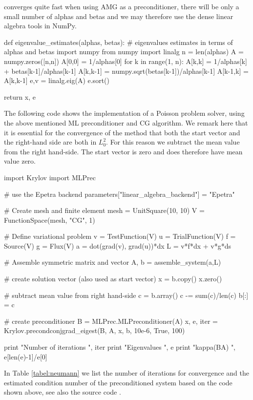 converges quite fast when using AMG as a preconditioner, there will be only a small
number of alphas and betas and we may therefore use the dense linear algebra tools in 
NumPy.
\begin{code}
def eigenvalue_estimates(alphas, betas):
    # eigenvalues estimates in terms of alphas and betas
    import numpy
    from numpy import linalg
    n = len(alphas)
    A = numpy.zeros([n,n])
    A[0,0] = 1/alphas[0]
    for k in range(1, n): 
        A[k,k] = 1/alphas[k] + betas[k-1]/alphas[k-1]
        A[k,k-1] = numpy.sqrt(betas[k-1])/alphas[k-1]
        A[k-1,k] = A[k,k-1]
    e,v = linalg.eig(A) 
    e.sort()

    return x, e
\end{code}
The following code shows the implementation of a Poisson problem solver, using the
above mentioned ML preconditioner and CG algorithm. We remark here that it
is essential for the convergence of the method that both the start vector 
and the right-hand side are both in $L^2_0$. For this reason we subtract the 
mean value from the right hand-side.  The start vector is zero and does therefore
have mean value zero. 
\begin{code}
import Krylov 
import MLPrec 

# use the Epetra backend
parameters["linear_algebra_backend"] = "Epetra"

# Create mesh and finite element
mesh = UnitSquare(10, 10)
V = FunctionSpace(mesh, "CG", 1)

# Define variational problem
v = TestFunction(V)
u = TrialFunction(V)
f = Source(V)
g = Flux(V)
a = dot(grad(v), grad(u))*dx
L = v*f*dx + v*g*ds

# Assemble symmetric matrix and vector
A, b = assemble_system(a,L)

# create solution vector (also used as start vector) 
x = b.copy()
x.zero()

# subtract mean value from right hand-side
c = b.array()
c -= sum(c)/len(c)
b[:] = c  

# create preconditioner
B = MLPrec.MLPreconditioner(A)
x, e, iter = Krylov.precondconjgrad_eigest(B, A, x, b, 10e-6, True, 100)

print "Number of iterations ", iter
print "Eigenvalues ", e 
print "kappa(BA) ", e[len(e)-1]/e[0]
\end{code}
In Table \ref{tabel:neumann} we list the number of iterations for convergence and
the estimated condition number of the preconditioned system based on the code 
shown above, see also the source code . 
